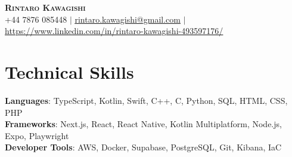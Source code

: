 \documentclass[letterpaper,11pt]{article}
\begin{document}

\begin{center}
    \textbf{\Huge \scshape Rintaro Kawagishi} \\ \vspace{1pt}
    +44 7876 085448 $|$ 
		\href{mailto:rintaro.kawagishi@gmail.com}{\underline{rintaro.kawagishi@gmail.com}} $|$ 
    \href{https://www.linkedin.com/in/rintaro-kawagishi-493597176/}{\underline{https://www.linkedin.com/in/rintaro-kawagishi-493597176/}}
\end{center}

\section{Technical Skills}
 \begin{itemize}[leftmargin=0.15in, label={}]
    \small{\item{
     \textbf{Languages}{: TypeScript, Kotlin, Swift, C++, C, Python, SQL, HTML, CSS, PHP} \\
     \textbf{Frameworks}{: Next.js, React, React Native, Kotlin Multiplatform, Node.js, Expo, Playwright} \\
     \textbf{Developer Tools}{: AWS, Docker, Supabase, PostgreSQL, Git, Kibana, IaC}
    }}
 \end{itemize}
\end{document}
